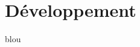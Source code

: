 \documentclass[12pt,space=onehalf,version=final]{yathesis}
\begin{document}
%
%
%
%
\chapter{Développement}
\label{chap-developpement}

blou
\end{document}
